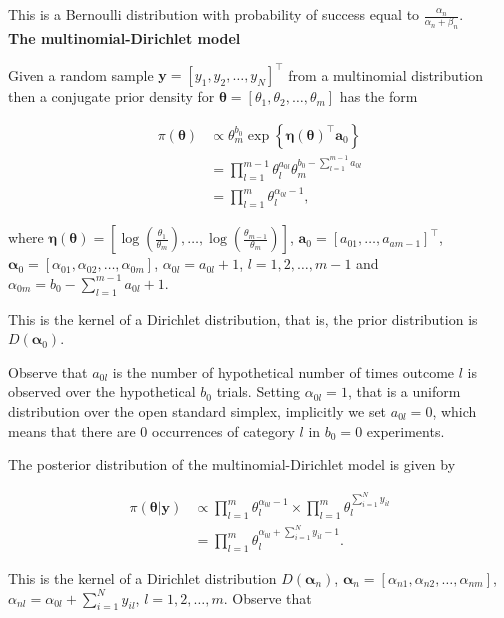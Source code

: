 \begin{enumerate}
This is a Bernoulli distribution with probability of success equal to $\frac{\alpha_n}{\alpha_n+\beta_n}$.\\ 

\textbf{The multinomial-Dirichlet model}

Given a random sample $\mathbf{y}=[y_1,y_2,\dots,y_N]^{\top}$ from a multinomial distribution then a conjugate prior density for $\mathbf{\theta}=\left[\theta_1,\theta_2,\dots,\theta_m\right]$ has the form 

\begin{align}
	\pi(\mathbf{\theta})&\propto \theta_m^{b_0} \exp\left\{\mathbf{\eta}(\mathbf{\theta})^{\top}\mathbf{a}_0\right\}\nonumber\\
	& = \prod_{l=1}^{m-1}\theta_l^{a_{0l}}\theta_m^{b_0-\sum_{l=1}^{m-1}a_{0l}}\nonumber\\
	& = \prod_{l=1}^{m}\theta_l^{\alpha_{0l}-1},\nonumber
\end{align}

where $\mathbf{\eta}(\mathbf{\theta})=\left[\log\left(\frac{\theta_1}{\theta_m}\right),\dots,\log\left(\frac{\theta_{m-1}}{\theta_m}\right)\right]$, $\mathbf{a}_0=\left[a_{01},\dots,a_{am-1}\right]^{\top}$, $\mathbf{\alpha}_0=\left[\alpha_{01},\alpha_{02},\dots,\alpha_{0m}\right]$, $\alpha_{0l}=a_{0l}+1$, $l=1,2,\dots,m-1$ and $\alpha_{0m}=b_0-\sum_{l=1}^{m-1} a_{0l}+1$. 

This is the kernel of a Dirichlet distribution, that is, the prior distribution is $D(\mathbf{\alpha}_0)$.

Observe that $a_{0l}$ is the number of hypothetical number of times outcome $l$ is observed over the hypothetical $b_0$ trials. Setting $\alpha_{0l}=1$, that is a uniform distribution over the open standard simplex, implicitly we set $a_{0l}=0$, which means that there are 0 occurrences of category $l$ in $b_0=0$ experiments.    

The posterior distribution of the multinomial-Dirichlet model is given by

\begin{align}
	\pi(\mathbf{\theta}|\mathbf{y})&\propto \prod_{l=1}^m \theta_l^{\alpha_{0l}-1}\times\prod_{l=1}^m \theta_l^{\sum_{i=1}^{N} y_{il}}\nonumber\\
	&=\prod_{l=1}^m \theta_l^{\alpha_{0l}+\sum_{i=1}^{N} y_{il}-1}\nonumber.
\end{align}

This is the kernel of a Dirichlet distribution $D(\mathbf{\alpha}_n)$, $\mathbf{\alpha}_n=\left[\alpha_{n1},\alpha_{n2},\dots,\alpha_{nm}\right]$, $\alpha_{nl}=\alpha_{0l}+\sum_{i=1}^{N}y_{il}$, $l=1,2,\dots,m$. Observe that


\end{enumerate}
